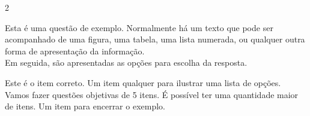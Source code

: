 \documentclass[11pt]{exam}
\begin{document}
\begin{multicols}{2}
\begin{questions}
\begin{question}[1] %
Esta é uma questão de exemplo. Normalmente há um texto que pode ser acompanhado de uma figura, uma tabela, uma lista numerada, ou qualquer outra forma de apresentação da informação. \\
Em seguida, são apresentadas as opções para escolha da resposta.

\begin{choices}
    \CorrectChoice Este é o item correto.
    \choice Um item qualquer para ilustrar uma lista de opções.
    \choice Vamos fazer questões objetivas de 5 itens.
    \choice É possível ter uma quantidade maior de itens.
    \choice Um item para encerrar o exemplo.
\end{choices}
\end{question}

\espacocalculos

\listaderespostas

\end{questions}
\end{multicols}
\end{document}

